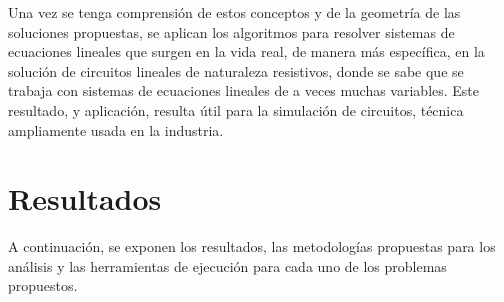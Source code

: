 \documentclass[11pt, spanish]{article}
\begin{document}
Una vez se tenga comprensión de estos conceptos y de la geometría de las soluciones propuestas, se aplican los algoritmos para resolver sistemas de ecuaciones lineales que surgen en la vida real, de manera más específica, en la solución de circuitos lineales de naturaleza resistivos, donde se sabe que se trabaja con sistemas de ecuaciones lineales de a veces muchas variables. Este resultado, y aplicación, resulta útil para la simulación de circuitos, técnica ampliamente usada en la industria.


\section{Resultados}

A continuación, se exponen los resultados, las metodologías propuestas para los análisis y las herramientas de ejecución para cada uno de los problemas propuestos.\\
\end{document}
